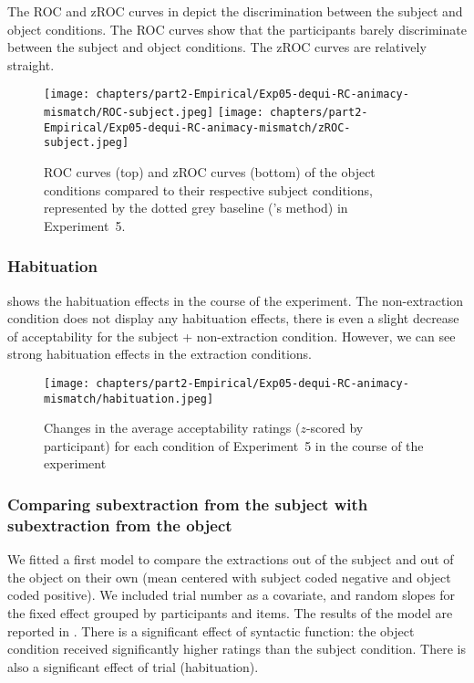 The ROC and zROC curves in  depict the discrimination between the subject and object conditions. The ROC curves show that the participants barely discriminate between the subject and object conditions. The zROC curves are relatively straight.

\begin{figure}
    \centering
    \texttt{[image: chapters/part2-Empirical/Exp05-dequi-RC-animacy-mismatch/ROC-subject.jpeg]}
    \texttt{[image: chapters/part2-Empirical/Exp05-dequi-RC-animacy-mismatch/zROC-subject.jpeg]}
    \caption{ROC curves (top) and zROC curves (bottom) of the object conditions compared to their respective subject conditions, represented by the dotted grey baseline (\citealt{Dillon.2019}'s method) in Experiment~5.}
    \label{fig:exp05-ROC-subj}
\end{figure}

\subsubsection{Habituation} 

 shows the habituation effects in the course of the experiment. The non-extraction condition does not display any habituation effects, there is even a slight decrease of acceptability for the subject + non-extraction condition. However, we can see strong habituation effects in the extraction conditions. 

\begin{figure}
    \centering
    \texttt{[image: chapters/part2-Empirical/Exp05-dequi-RC-animacy-mismatch/habituation.jpeg]}
    \caption{Changes in the average acceptability ratings ($z$-scored by participant) for each condition of Experiment~5 in the course of the experiment}
    \label{fig:exp05-habituation}
\end{figure}

\subsubsection{Comparing subextraction from the subject with subextraction from the object}

We fitted a first model to compare the extractions out of the subject and out of the object on their own (mean centered with subject coded negative and object coded positive). We included trial number as a covariate, and random slopes for the fixed effect grouped by participants and items. The results of the model are reported in . There is a significant effect of syntactic function: the object condition received significantly higher ratings than the subject condition. There is also a significant effect of trial (habituation).

